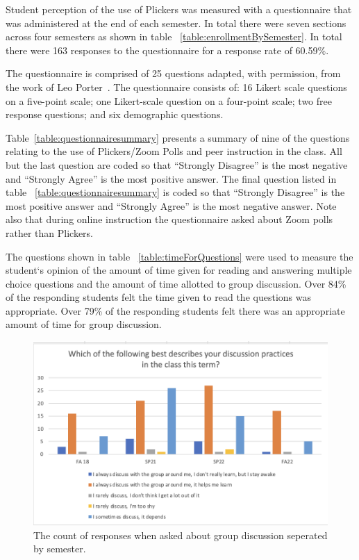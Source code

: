 \documentclass[12pt]{article}
\newcommand\sampleSize{163}
\begin{document}
Student perception of the use of Plickers was measured with a questionnaire that was administered at the end of each semester. In total there were seven sections across four semesters as shown in table ~\ref{table:enrollmentBySemester}. In total there were \sampleSize{}  responses to the questionnaire for a response rate of 60.59\%.

The questionnaire is comprised of 25 questions adapted, with permission, from the work of Leo Porter~\cite{porterPeerInstructionStudents2011}. The questionnaire consists of: 16 Likert scale questions on a five-point scale; one Likert-scale question on a four-point scale;  two free response questions; and six demographic questions. 

Table~\ref{table:questionnairesummary} presents a summary of nine of the questions relating to the use of Plickers/Zoom Polls and peer instruction in the class. All but the last question are coded so that ``Strongly Disagree'' is the most negative and ``Strongly Agree'' is the most positive answer. The final question listed in table ~\ref{table:questionnairesummary} is coded so that ``Strongly Disagree'' is the most positive answer and ``Strongly Agree'' is the most negative answer. Note also that during online instruction the questionnaire asked about Zoom polls rather than Plickers.

The questions shown in table ~\ref{table:timeForQuestions} were used to measure the student`s opinion of the amount of time given for reading and answering multiple choice questions and the amount of time allotted to group discussion. Over 84\% of the responding students felt the time given to read the questions was appropriate. Over 79\% of the responding students felt there was an appropriate amount of time for group discussion. 

\begin{figure}[ht]
  \includegraphics[width=\linewidth]{count_discussion.png}
  \caption{The count of responses when asked about group discussion seperated by semester.}
  \label{fig:group_discussion}
\end{figure}
\end{document}
